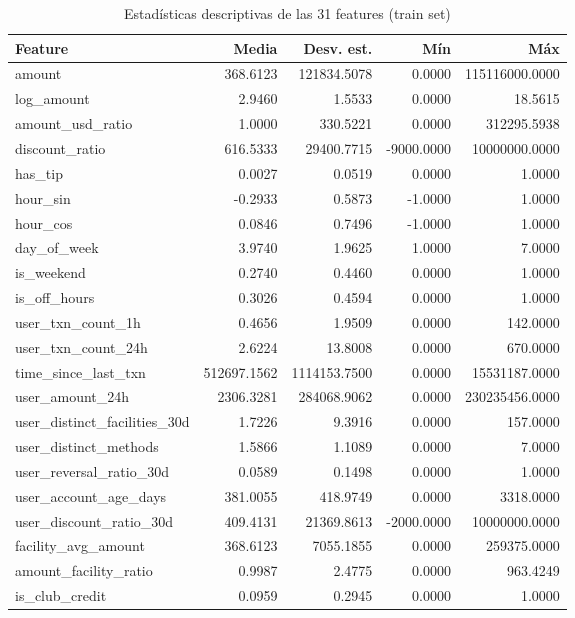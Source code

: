 \begin{table}[htbp]
\centering
\scriptsize
\caption{Estad\'{i}sticas descriptivas de las 31 features (train set)}
\label{tab:feature-statistics}
\begin{tabular}{lrrrr}
\toprule
Feature & Media & Desv. est. & M\'{i}n & M\'{a}x \\
\midrule
  amount & 368.6123 & 121834.5078 & 0.0000 & 115116000.0000 \\
  log\_amount & 2.9460 & 1.5533 & 0.0000 & 18.5615 \\
  amount\_usd\_ratio & 1.0000 & 330.5221 & 0.0000 & 312295.5938 \\
  discount\_ratio & 616.5333 & 29400.7715 & -9000.0000 & 10000000.0000 \\
  has\_tip & 0.0027 & 0.0519 & 0.0000 & 1.0000 \\
  hour\_sin & -0.2933 & 0.5873 & -1.0000 & 1.0000 \\
  hour\_cos & 0.0846 & 0.7496 & -1.0000 & 1.0000 \\
  day\_of\_week & 3.9740 & 1.9625 & 1.0000 & 7.0000 \\
  is\_weekend & 0.2740 & 0.4460 & 0.0000 & 1.0000 \\
  is\_off\_hours & 0.3026 & 0.4594 & 0.0000 & 1.0000 \\
  user\_txn\_count\_1h & 0.4656 & 1.9509 & 0.0000 & 142.0000 \\
  user\_txn\_count\_24h & 2.6224 & 13.8008 & 0.0000 & 670.0000 \\
  time\_since\_last\_txn & 512697.1562 & 1114153.7500 & 0.0000 & 15531187.0000 \\
  user\_amount\_24h & 2306.3281 & 284068.9062 & 0.0000 & 230235456.0000 \\
  user\_distinct\_facilities\_30d & 1.7226 & 9.3916 & 0.0000 & 157.0000 \\
  user\_distinct\_methods & 1.5866 & 1.1089 & 0.0000 & 7.0000 \\
  user\_reversal\_ratio\_30d & 0.0589 & 0.1498 & 0.0000 & 1.0000 \\
  user\_account\_age\_days & 381.0055 & 418.9749 & 0.0000 & 3318.0000 \\
  user\_discount\_ratio\_30d & 409.4131 & 21369.8613 & -2000.0000 & 10000000.0000 \\
  facility\_avg\_amount & 368.6123 & 7055.1855 & 0.0000 & 259375.0000 \\
  amount\_facility\_ratio & 0.9987 & 2.4775 & 0.0000 & 963.4249 \\
  is\_club\_credit & 0.0959 & 0.2945 & 0.0000 & 1.0000 \\

\end{tabular}
\end{table}
